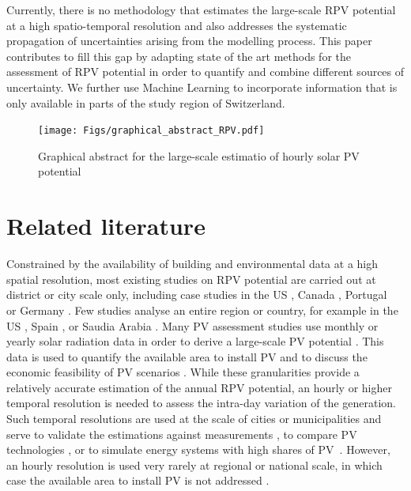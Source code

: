 Currently, there is no methodology that estimates the large-scale RPV potential at a high spatio-temporal resolution and also addresses the systematic propagation of uncertainties arising from the modelling process.
This paper contributes to fill this gap by adapting state of the art methods for the assessment of RPV potential in order to quantify and combine different sources of uncertainty. 
We further use Machine Learning to incorporate information that is only available in parts of the study region of Switzerland.

\begin{figure}[tb]
\centering\texttt{[image: Figs/graphical\_abstract\_RPV.pdf]}
\caption{Graphical abstract for the large-scale estimatio of hourly solar PV potential}
\label{fig:graphical_abstract_RPV}
\end{figure}

\section{Related literature}
Constrained by the availability of building and environmental data at a high spatial resolution, most existing studies on RPV potential are carried out at district or city scale only, including case studies in the US \cite{levinson_solar_2009}, Canada \cite{nguyen_incorporating_2012}, Portugal~\cite{santos_applications_2014} or Germany \cite{strzalka_large_2012}. 
Few studies analyse an entire region or country, for example in the US \cite{phillips_data_2019, kodysh_methodology_2013}, Spain \cite{schallenberg-rodriguez_photovoltaic_2013}, or Saudia Arabia \cite{khan_rooftop_2017}. 
%
Many PV assessment studies use monthly or yearly solar radiation data in order to derive a large-scale PV potential \cite{ordonez_analysis_2010}. This data is used to quantify the available area to install PV \cite{mansouri_kouhestani_evaluating_2019} and to discuss the economic feasibility of PV scenarios \cite{romero_rodriguez_assessment_2017}.
While these granularities provide a relatively accurate estimation of the annual RPV potential, an hourly or higher temporal resolution is needed to assess the intra-day variation of the generation. Such temporal resolutions are used at the scale of cities or municipalities \cite{hong_development_2017, singh_estimation_2015} and serve to validate the estimations against measurements \cite{jakubiec_method_2013}, to compare PV technologies \cite{lukac_buildings_2014}, or to simulate energy systems with high shares of PV~\cite{wegertseder_combining_2016}. However, an hourly resolution is used very rarely at regional or national scale, in which case the available area to install PV is not addressed \cite{buffat_scalable_2018}.

